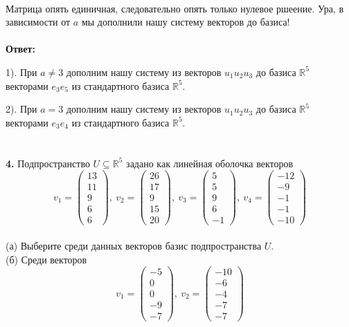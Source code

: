 \documentclass[a4paper, 12pt]{article}
\begin{document}
    \\ Матрица опять единичная, следовательно опять только нулевое ршеение. Ура, в зависимости от $a$ мы дополнили нашу систему векторов до базиса!
    \\
    \\ \textbf{Ответ: } 
    \par 1). При $a \neq 3$ дополним нашу систему из векторов $u_1 u_2 u_3$ до базиса $\mathbb{R}^5$ векторами $e_3 e_5$ из стандартного базиса $\mathbb{R}^5$. 
    \par 2). При $a = 3$ дополним нашу систему из векторов $u_1 u_2 u_3$ до базиса $\mathbb{R}^5$ векторами $e_3 e_4$ из стандартного базиса $\mathbb{R}^5$.
    \\
    \\
    \\ \textbf{4.} Подпространство $U \subseteq \mathbb{R}^5$ задано как линейная оболочка векторов
    \[
        v_1 = \begin{pmatrix}13 \\ 11 \\ 9 \\ 6 \\ 6\end{pmatrix}, \ v_2 = \begin{pmatrix}26 \\ 17 \\ 9 \\ 15 \\ 20\end{pmatrix}, \ v_3 = \begin{pmatrix}5 \\ 5 \\ 9 \\ 6 \\ -1\end{pmatrix}, \ v_4 = \begin{pmatrix}-12 \\ -9 \\ -1 \\ -1 \\ -10\end{pmatrix}   
    \]
    \\ (а) Выберите среди данных векторов базис подпространства $U$.
    \\ (б) Среди векторов
    \[
        v_1 = \begin{pmatrix}-5 \\ 0 \\ 0\\ -9 \\ -7\end{pmatrix}, \ v_2 = \begin{pmatrix}-10 \\ -6 \\ -4 \\ -7 \\ -7\end{pmatrix}    
    \]
\end{document}
